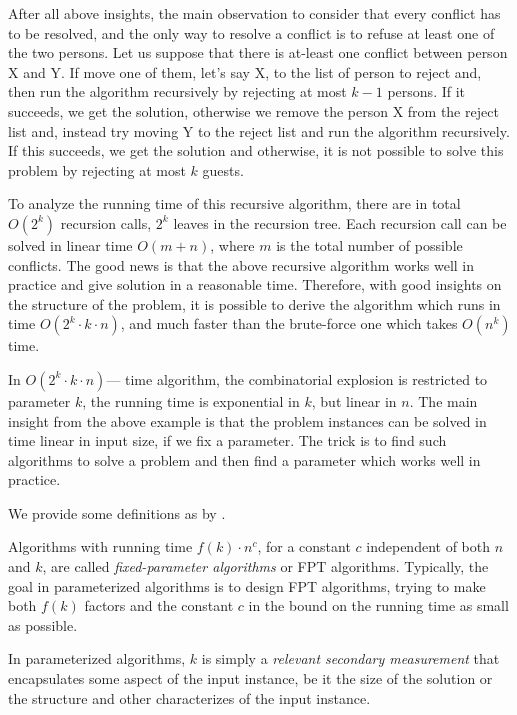 After all above insights, the main observation to consider that every conflict has to be resolved, and the only way to resolve a conflict is to refuse at least one of the two persons.
Let us suppose that there is at-least one conflict between person X and Y. 
If move one of them, let's say X, to the list of person to reject and, then run the algorithm recursively by rejecting at most $k-1$ persons.
If it succeeds, we get the solution, otherwise we remove the person X from the reject list and, instead try moving Y to the reject list and run the algorithm recursively.
If this succeeds, we get the solution and otherwise, it is not possible to solve this problem by rejecting at most $k$ guests.

To analyze the running time of this recursive algorithm, there are in total $O(2^k)$ recursion calls, $2^k$ leaves in the recursion tree.
Each recursion call can be solved in linear time $O(m+n)$, where $m$ is the total number of possible conflicts.
The good news is that the above recursive algorithm works well in practice and give solution in a reasonable time.
Therefore, with good insights on the structure of the problem, it is possible to derive the algorithm which runs in time $O(2^k \cdot k \cdot n)$, 
and much faster than the brute-force one which takes $O(n^k)$ time.

In $O(2^k \cdot k \cdot n)$--- time algorithm, the combinatorial explosion is restricted to parameter $k$,
the running time is exponential in $k$, but linear in $n$.
The main insight from the above example is that the problem instances can be solved in time linear in input size, if we fix a parameter. 
The trick is to find such algorithms to solve a problem and then find a parameter which works well in practice. 

We provide some definitions as by \cite{cygan2015parameterized}.

\begin{definition}
 Algorithms with running time $f(k)\cdot n^c$, for a constant $c$ independent of both $n$ and $k$, are called \textit{fixed-parameter algorithms} or FPT algorithms.
 Typically, the goal in parameterized algorithms is to design FPT algorithms, trying to make both $f(k)$ factors 
 and the constant $c$ in the bound on the running time as small as possible. 
 \end{definition}
 
 In parameterized algorithms, $k$ is simply a \textit{relevant secondary measurement} 
 that encapsulates some aspect of the input instance, be it the size of the solution or the structure and other characterizes of the input instance.


